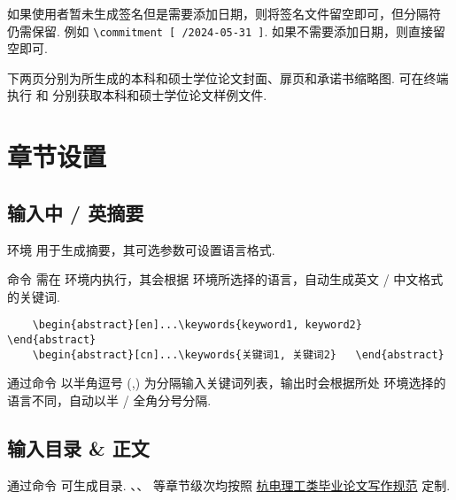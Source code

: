 如果使用者暂未生成签名但是需要添加日期，则将签名文件留空即可，但分隔符 \cmd{/} 仍需保留. 例如 
\verb|\commitment [ /2024-05-31 ]|. 如果不需要添加日期，则直接留空即可.

下两页分别为所生成的本科和硕士学位论文封面、扉页和承诺书缩略图. 可在终端执行  和   分别获取本科和硕士学位论文样例文件.


\section{章节设置}

\subsection{输入中 / 英摘要}

环境  用于生成摘要，其可选参数可设置语言格式.

\DescribeMacro{\keywords}
命令  需在  环境内执行，其会根据  环境所选择的语言，自动生成英文 / 中文格式的关键词.

\begin{framed}
  \begin{verbatim}
    \begin{abstract}[en]...\keywords{keyword1, keyword2}  \end{abstract}
    \begin{abstract}[cn]...\keywords{关键词1, 关键词2}   \end{abstract}
  \end{verbatim}
\end{framed}

通过命令  以半角逗号 (,) 为分隔输入关键词列表，输出时会根据所处  环境选择的语言不同，自动以半 / 全角分号分隔.

\subsection{输入目录 \& 正文}

通过命令  可生成目录. 、、 等章节级次均按照 \href{https://jwc.hdu.edu.cn/2022/0428/c4528a153813/page.htm}{杭电理工类毕业论文写作规范} 定制.

